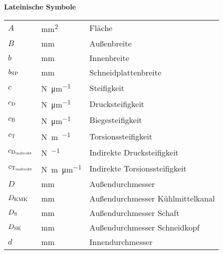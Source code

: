 

\textbf{Lateinische Symbole} \vspace{0.5cm}
  
\begin{tabular}{p{2cm} p{2cm} l}
$A$ 						& \si{\milli\meter^2}							&Fläche \\

$B$						& \si{\milli\meter}							&Außenbreite\\

$b$						& \si{\milli\meter}							&Innenbreite \\

$b_{\rm{SP}}$		& \si{\milli\meter}							&Schneidplattenbreite \\

$c$						& \si{\newton\per\micro\meter}			&Steifigkeit \\

$c_{\rm{D}}$			& \si{\newton\per\micro\meter}	 		&Drucksteifigkeit \\

$c_{\rm{B}}$			& \si{\newton\per\micro\meter}	 		&Biegesteifigkeit \\

$c_{\rm{T}}$			& \si{\newton\meter\per\circ}	 		&Torsionssteifigkeit \\

$c_{\rm{D_{\rm{indirekt}}}}$			& \si{\newton\per\circ}	 		&Indirekte Drucksteifigkeit \\

$c_{\rm{T_{\rm{indirekt}}}}$			& \si{\newton\meter\per\micro\meter}	 		&Indirekte Torsionssteifigkeit \\

$D$						& \si{\milli\meter}							&Außendurchmesser \\

$D_{\rm{KMK}}$			& \si{\milli\meter}							&Außendurchmesser Kühlmittelkanal \\

$D_{\rm{S}}$			& \si{\milli\meter}							&Außendurchmesser Schaft \\

$D_{\rm{SK}}$		& \si{\milli\meter}							&Außendurchmesser Schneidkopf \\
                    
$d$						&	\si{\milli\meter}							&Innendurchmesser \\


\end{tabular}
